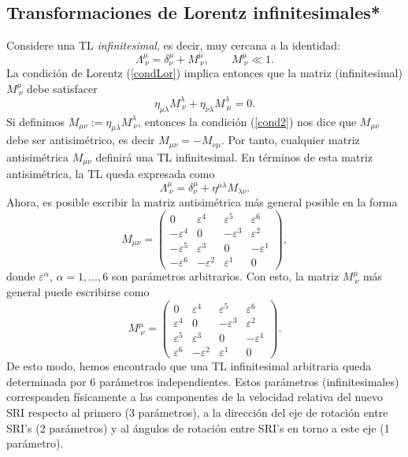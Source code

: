 \subsection{Transformaciones de Lorentz infinitesimales*}
Considere una TL \textit{infinitesimal}, es decir, muy cercana a la identidad:
\begin{equation}
\Lambda^\mu_{\ \nu}=\delta^\mu_\nu+M^\mu_{\ \nu}, \qquad M^\mu_{\ \nu}\ll 1.
\end{equation}
La condición de Lorentz (\ref{condLor}) implica entonces que la matriz
(infinitesimal) $M^\mu_{\ \nu}$ debe satisfacer
\begin{equation}
\eta_{\mu\lambda}M^\lambda_{\ \nu}+\eta_{\nu\lambda}M^\lambda_{\ \mu}=0.
\label{cond2}
\end{equation}
Si definimos $M_{\mu\nu}:=\eta_{\mu\lambda}M^\lambda_{\  \nu}$, entonces la
condición (\ref{cond2}) nos dice que $M_{\mu\nu}$ debe ser antisimétrico, es
decir $M_{\mu\nu}=-M_{\nu\mu}$. Por tanto, cualquier matriz antisimétrica
$M_{\mu\nu}$ definirá una TL infinitesimal. En términos de esta matriz
antisimétrica, la TL queda expresada como
\begin{equation}
\Lambda^\mu_{\ \nu}=\delta^\mu_\nu+\eta^{\mu\lambda}M_{\lambda\nu}.
\end{equation}
Ahora, es posible escribir la matriz antisimétrica más general posible en la
forma
\begin{equation}
M_{\mu\nu}=\left( \begin{array}{cccc}
0 & \varepsilon^4 & \varepsilon^{5} & \varepsilon^{6} \\
-\varepsilon^4 & 0 & -\varepsilon^3 & \varepsilon^2 \\
-\varepsilon^{5} & \varepsilon^3 & 0 & -\varepsilon^1 \\
-\varepsilon^{6} & -\varepsilon^2 & \varepsilon^1 & 0
\end{array}
\right) ,
\end{equation}
donde $\varepsilon^\alpha$, $\alpha=1,\dots,6$ son parámetros arbitrarios. Con
esto, la matriz $M^\mu_{\ \nu}$ más general puede escribirse como
\begin{equation}
M^\mu_{\ \nu}=\left( \begin{array}{cccc}
0 & \varepsilon ^4 & \varepsilon ^{5} & \varepsilon ^{6} \\
\varepsilon ^4 & 0 & -\varepsilon ^3 & \varepsilon^2 \\
\varepsilon ^{5} & \varepsilon ^3 & 0 & -\varepsilon ^1 \\
\varepsilon ^{6} & -\varepsilon^2 & \varepsilon ^1 & 0
\end{array}
\right) .\label{Marab}
\end{equation}
De esto modo, hemos encontrado que una TL infinitesimal arbitraria queda
determinada por 6 parámetros independientes. Estos parámetros
(infinitesimales) corresponden físicamente a las componentes de la velocidad
relativa del nuevo SRI respecto al primero (3 parámetros), a la dirección del
eje de rotación entre SRI's (2 parámetros) y al ángulos de rotación entre
SRI's en torno a este eje (1 parámetro).

